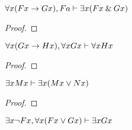 \begin{earg}


\noindent\begin{minipage}{0.99\textwidth}
\item $\forall x(Fx \rightarrow Gx), Fa \vdash \exists x(Fx \mathbin{\&} Gx)$

\begin{proof}
	 \pr{}
	 \pr{}
	 
	 
	 
	 	
\end{proof}
\bigskip
\end{minipage}

\noindent\begin{minipage}{0.99\textwidth}
\item $\forall x(Gx \rightarrow Hx), \forall xGx \vdash \forall xHx$

\begin{proof}
	 \pr{}
	 \pr{}
	 
	 
	 
	 
\end{proof}
\bigskip
\end{minipage}

\noindent\begin{minipage}{0.99\textwidth}
\item $\exists xMx \vdash \exists x(Mx \vee Nx)$

\begin{proof}
	 \pr{}
	\open
		 \as{}
		 
		 
	\close
	 
\end{proof}
\bigskip
\end{minipage}

\noindent\begin{minipage}{0.99\textwidth}
\item $\exists x {\neg} Fx, \forall x(Fx \vee Gx) \vdash \exists xGx$


\end{minipage}
\end{earg}
